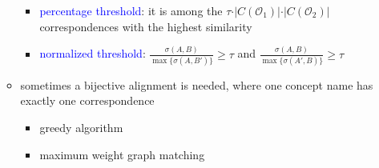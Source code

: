 \documentclass[12pt,a4paper]{article}
\newcommand{\blue}[1]{\textcolor{blue} {#1}}
\newcommand{\ont}{\mathcal{O}}
\begin{document}
\begin{itemize}
\begin{itemize}
\begin{itemize}
\item \blue{percentage threshold}: it is among the $\tau\cdot\vert C(\ont_1)\vert\cdot\vert C(\ont_2)\vert$ correspondences with the highest similarity
\item \blue{normalized threshold}: $\displaystyle \frac{\sigma(A,B)}{\max\{\sigma(A,B')\}} \geq \tau$ and $\displaystyle\frac{\sigma(A,B)}{\max\{\sigma(A',B)\}} \geq \tau$
\end{itemize}
\item sometimes a bijective alignment is needed, where one concept name has exactly one correspondence
\begin{itemize}
\item greedy algorithm
\item maximum weight graph matching
\end{itemize}
\end{itemize}
\end{itemize}
\end{document}
